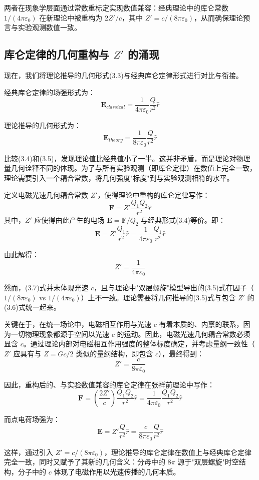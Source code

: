 \documentclass[a4paper,12pt]{article}
\theoremstyle{plain}
\renewcommand{\vec}[1]{\bm{#1}}
\begin{document}
两者在现象学层面通过常数重标定实现数值兼容：经典理论中的库仑常数 $1/(4\pi\varepsilon_0)$ 在新理论中被重构为 $2Z'/c$，其中 $Z' = c/(8\pi\varepsilon_0)$，从而确保理论预言与实验观测数值一致。

\subsection{库仑定律的几何重构与 $Z'$ 的涌现}
现在，我们将理论推导的几何形式(3.3)与经典库仑定律形式进行对比与衔接。

经典库仑定律的场强形式为：
$$\vec{E}_{classical} = \frac{1}{4\pi\varepsilon_0} \frac{Q}{r^2} \hat{r} \tag{3.4}$$ 

理论推导的几何形式为：
$$\vec{E}_{theory} = \frac{1}{8\pi\varepsilon_0} \frac{Q}{r^2} \hat{r} \tag{3.5}$$ 

比较(3.4)和(3.5)，发现理论值比经典值小了一半。这并非矛盾，而是理论对物理量几何诠释不同的体现。为了与所有实验观测（即库仑定律）在数值上完全一致，理论需要引入一个耦合常数，将几何强度"标度"到与实验观测相符的水平。

定义电磁光速几何耦合常数 $Z'$，使得理论中重构的库仑定律写作：
$$\vec{F} = Z' \frac{Q_1 Q_2}{r^2} \hat{r} \tag{3.6}$$ 
其中，$Z'$ 应使得由此产生的电场 $\vec{E} = \vec{F}/Q_2$ 与经典形式(3.4)等价。即：
$$\vec{E} = Z' \frac{Q_1}{r^2} \hat{r} = \frac{1}{4\pi\varepsilon_0} \frac{Q_1}{r^2} \hat{r}$$ 

由此解得：
$$Z' = \frac{1}{4\pi\varepsilon_0} \tag{3.7}$$ 

然而，(3.7)式并未体现光速 $c$，且与理论中"双层螺旋"模型导出的(3.5)式在因子（$1/(8\pi\varepsilon_0)$ vs $1/(4\pi\varepsilon_0)$）上不一致。理论需要将几何推导的(3.5)式与包含 $Z'$ 的(3.6)式统一起来。

关键在于，在统一场论中，电磁相互作用与光速 $c$ 有着本质的、内禀的联系，因为一切物理现象都源于空间以光速 $c$ 的运动。因此，电磁光速几何耦合常数必须显含 $c$。通过理论内部对电磁相互作用强度的整体标度确定，并考虑量纲一致性（$Z'$ 应具有与 $Z = Gc/2$ 类似的量纲结构，即包含 $c$），最终得到：
$$\boxed{Z' = \frac{c}{8\pi\varepsilon_0}} \tag{3.8}$$ 

因此，重构后的、与实验数值兼容的库仑定律在张祥前理论中写作：
$$\vec{F} = \left( \frac{2Z'}{c} \right) \frac{Q_1 Q_2}{r^2} \hat{r} = \frac{1}{4\pi\varepsilon_0} \frac{Q_1 Q_2}{r^2} \hat{r} \tag{3.9}$$ 

而点电荷场强为：
$$\vec{E} = Z' \frac{Q}{r^2} \hat{r} = \frac{c}{8\pi\varepsilon_0} \frac{Q}{r^2} \hat{r} \tag{3.10}$$ 

这样，通过引入 $Z' = c/(8\pi\varepsilon_0)$，理论推导的库仑定律在数值上与经典库仑定律完全一致，同时又赋予了其新的几何含义：分母中的 $8\pi$ 源于"双层螺旋"时空结构，分子中的 $c$ 体现了电磁作用以光速传播的几何本质。
\end{document}

